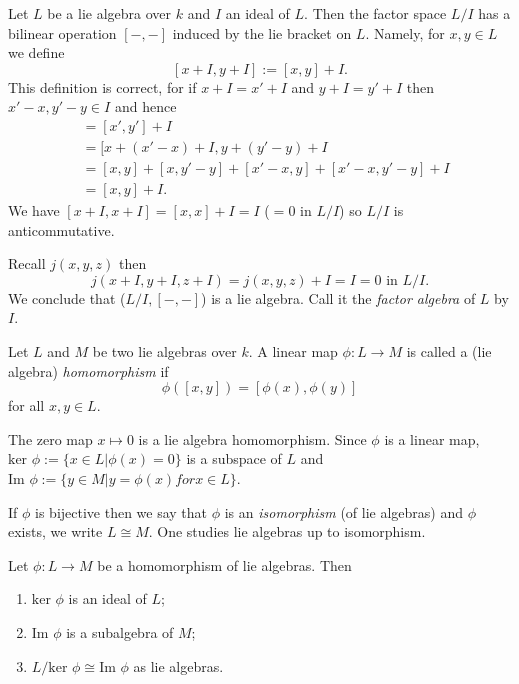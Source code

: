 Let $L$ be a lie algebra over $k$ and $I$ an ideal of $L$. Then the factor space $L/I$ has a bilinear operation $[-,-]$ induced by the lie bracket on $L$. Namely, for $x,y \in L$ we define
\[
  [x + I, y + I] := [x, y] + I.
\]
This definition is correct, for if $x + I = x' + I$ and $y + I = y' + I$ then $x' - x, y' - y \in I$ and hence
\begin{align*}
  [x' + I, y' + I] &= [x', y'] + I\\
                   &= [x + (x' - x) + I, y + (y' - y) + I\\
                   &= [x, y] + [x, y' - y] + [x' - x, y] + [x' - x, y' - y] + I\\
                   &= [x, y] + I.
\end{align*}
We have $[x + I, x + I] = [x, x] + I = I$ ($ = 0 \text{ in } L/I$) so $L/I$ is anticommutative.

Recall $j(x, y, z)$ then
\[
  j(x + I, y + I, z + I) = j(x, y, z) + I = I = 0 \text{ in } L/I.
\]
We conclude that ($L/I, [-,-]$) is a lie algebra. Call it the \emph{factor algebra} of $L$ by $I$.

\begin{definition}
  Let $L$ and $M$ be two lie algebras over $k$. A linear map $\phi : L \to M$ is called a (lie algebra) \emph{homomorphism} if
  \[
    \phi([x, y]) = [\phi(x), \phi(y)]
  \]
  for all $x, y \in L$.
\end{definition}

\begin{example}
  The zero map $x \mapsto 0$ is a lie algebra homomorphism. Since $\phi$ is a linear map, $\text{ker } \phi := \{ x \in L | \phi(x) = 0 \}$ is a subspace of $L$ and $\text{Im } \phi := \{ y \in M | y = \phi(x) for x \in L \}$.
\end{example}

If $\phi$ is bijective then we say that $\phi$ is an \emph{isomorphism} (of lie algebras) and $\phi$ exists, we write $L \cong M$. One studies lie algebras up to isomorphism.

\begin{theorem}[On isomorphisms]
  Let $\phi : L \to M$ be a homomorphism of lie algebras. Then
  \begin{enumerate}
    \item $\text{ker }\phi$ is an ideal of $L$;
    \item $\text{Im }\phi$ is a subalgebra of $M$;
    \item $L/\text{ker }\phi \cong \text{Im }\phi$ as lie algebras.
  \end{enumerate}
\end{theorem}

